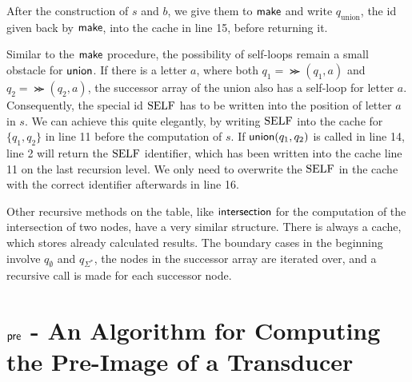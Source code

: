 \par 

After the construction of $s$ and $b$, we give them to $\operatorname{\textsf{make}}$ and write $q_{\text{union}}$, the id given back by $\operatorname{\textsf{make}}$, into the cache in line 15, before returning it.

\par

Similar to the $\operatorname{\textsf{make}}$ procedure, the possibility of self-loops remain a small obstacle for $\operatorname{\textsf{union}}$. If there is a letter $a$, where both $q_{1} = \Succ(q_{1},a)$ and $q_{2} = \Succ(q_{2},a)$, the successor array of the union also has a self-loop for letter $a$. Consequently, the special id $\mathrm{SELF}$ has to be written into the position of letter $a$ in $s$. We can achieve this quite elegantly, by writing $\mathrm{SELF}$ into the cache for $\{q_{1},q_{2}\}$ in line 11 before the computation of $s$. If $\operatorname{\textsf{union}}(q_{1},q_{2})$ is called in line 14, line 2 will return the $\mathrm{SELF}$ identifier, which has been written into the cache line 11 on the last recursion level. We only need to overwrite the $\mathrm{SELF}$ in the cache with the correct identifier afterwards in line 16.
\par
Other recursive methods on the table, like $\operatorname{\textsf{intersection}}$ for the computation of the intersection of two nodes, have a very similar structure. There is always a cache, which stores already calculated results. The boundary cases in the beginning involve $q_{\emptyset}$ and $q_{\Sigma^{*}}$, the nodes in the successor array are iterated over, and a recursive call is made for each successor node. 


\section{$\operatorname{\textsf{pre}}$ - An Algorithm for Computing the Pre-Image of a Transducer}\label{sec:pre}

